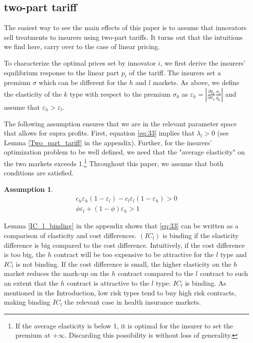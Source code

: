 \documentclass[a4paper,12pt]{article}
\newtheorem{assumption}{Assumption}
\begin{document}
\subsection{two-part tariff}
\label{sec:orgd3682ff}

The easiest way to see the main effects of this paper is to assume that innovators sell treatments to insurers using two-part tariffs. It turns out that the intuitions we find here, carry over to the case of linear pricing.

To characterize the optimal prices set by innovator \(i\), we first derive the insurers' equilibrium response to the linear part \(p_i\) of the tariff. The insurers set a premium \(\sigma\) which can be different for the \(h\) and \(l\) markets. As above, we define the elasticity of the \(k\) type with respect to the premium \(\sigma_k\) as \(\varepsilon_k = |\frac{\partial q_k}{\partial \sigma_k} \frac{\sigma_k}{q_{k}}|\) and assume that \(\varepsilon_h > \varepsilon_l\).

The following assumption ensures that we are in the relevant parameter space that allows for supra profits. First, equation \eqref{eq:33} implies that \(\lambda_l >0\) (see Lemma \ref{Two_part_tariff} in the appendix). Further, for the insurers' optimization problem to be well defined, we need that the "average elasticity" on the two markets exceeds 1.\footnote{If the average elasticity is below 1, it is optimal for the insurer to set the premium at \(+\infty\). Discarding this possibility is without loss of generality.} Throughout this paper, we assume that both conditions are satisfied.

\begin{assumption}
\label{Elasticities}
\begin{align}
\label{eq:33}
c_h \varepsilon_h (1- \varepsilon_l )-c_l \varepsilon_l(1-\varepsilon_h) > 0 \\
\label{eq:33a}
\phi \varepsilon_l + (1-\phi) \varepsilon_h > 1
\end{align}
\end{assumption}

Lemma \ref{IC_l_binding} in the appendix shows that \eqref{eq:33} can be written as a comparison of elasticity and cost differences. \((IC_{l})\) is binding if the elasticity difference is big compared to the cost difference. Intuitively, if the cost difference is too big, the \(h\) contract will be too expensive to be attractive for the \(l\) type and \(IC_l\) is not binding. If the cost difference is small, the higher elasticity on the \(h\) market reduces the mark-up on the \(h\) contract compared to the \(l\) contract to such an extent that the \(h\) contract is attractive to the \(l\) type: \(IC_l\) is binding. As mentioned in the Introduction, low risk types tend to buy high risk contracts, making binding \(IC_l\) the relevant case in health insurance markets. 
\end{document}
